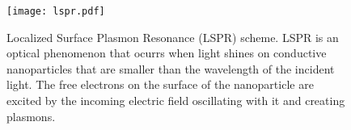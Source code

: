 
\begin{figure}[h] %
   \centering
   \texttt{[image: lspr.pdf]} 
   \caption{Localized Surface Plasmon Resonance (LSPR) scheme. LSPR is an 
            optical phenomenon that ocurrs when light shines on conductive 
            nanoparticles that are smaller than the wavelength of the incident 
            light. The free electrons on the surface of the nanoparticle are 
            excited by the incoming electric field oscillating with it and 
            creating plasmons.}
   \label{fig:lspr}
\end{figure}




